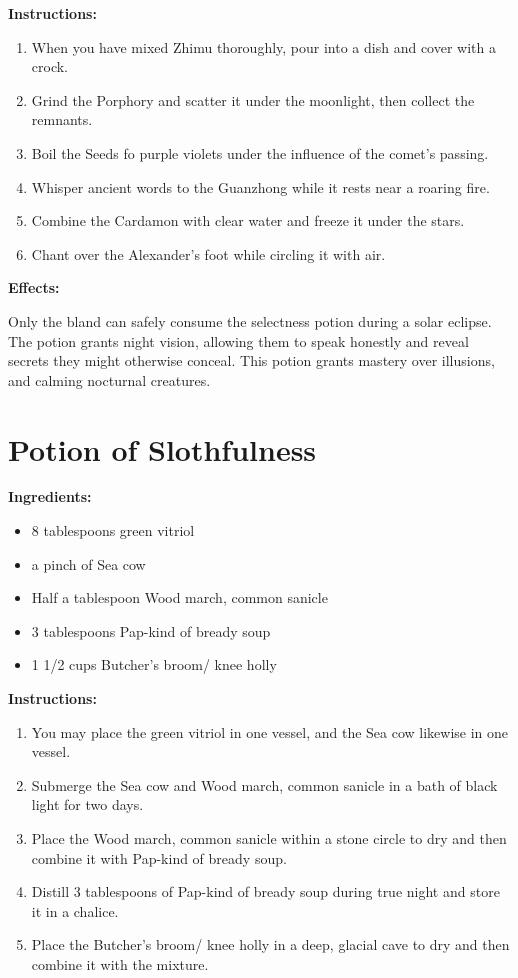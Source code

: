 \documentclass{article}
\begin{document}
\textbf{Instructions:}

\begin{enumerate}
  \item When you have mixed Zhimu thoroughly, pour into a dish and cover with a crock.
  \item Grind the Porphory and scatter it under the moonlight, then collect the remnants.
  \item Boil the Seeds fo purple violets under the influence of the comet’s passing.
  \item Whisper ancient words to the Guanzhong while it rests near a roaring fire.
  \item Combine the Cardamon with clear water and freeze it under the stars.
  \item Chant over the Alexander's foot while circling it with air.
\end{enumerate}

\textbf{Effects:}

Only the bland can safely consume the selectness potion during a solar eclipse. The potion grants night vision, allowing them to speak honestly and reveal secrets they might otherwise conceal. This potion grants mastery over illusions, and calming nocturnal creatures.

\newpage
\section*{Potion of Slothfulness}

\textbf{Ingredients:}

\begin{itemize}
  \item 8 tablespoons green vitriol
  \item a pinch of Sea cow
  \item Half a tablespoon Wood march, common sanicle
  \item 3 tablespoons Pap-kind of bready soup
  \item 1 1/2 cups Butcher's broom/ knee holly
\end{itemize}

\textbf{Instructions:}

\begin{enumerate}
  \item You may place the green vitriol in one vessel, and the Sea cow likewise in one vessel.
  \item Submerge the Sea cow and Wood march, common sanicle in a bath of black light for two days.
  \item Place the Wood march, common sanicle within a stone circle to dry and then combine it with Pap-kind of bready soup.
  \item Distill 3 tablespoons of Pap-kind of bready soup during true night and store it in a chalice.
  \item Place the Butcher's broom/ knee holly in a deep, glacial cave to dry and then combine it with the mixture.
\end{enumerate}
\end{document}
